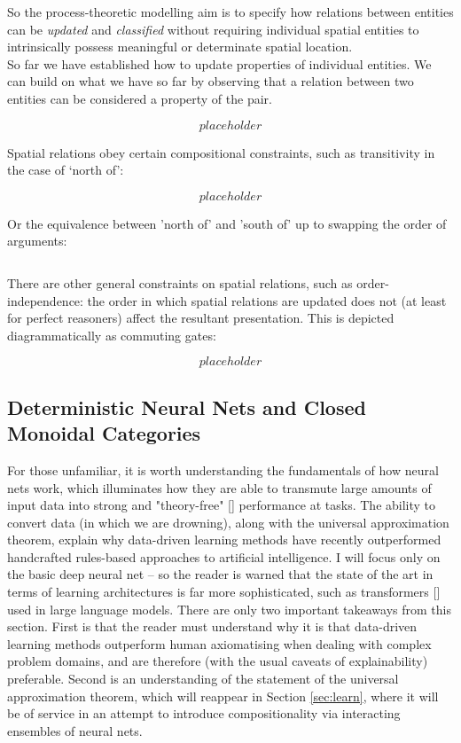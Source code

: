 So the process-theoretic modelling aim is to specify how relations between entities can be \emph{updated} and \emph{classified} without requiring individual spatial entities to intrinsically possess meaningful or determinate spatial location.\\

So far we have established how to update properties of individual entities. We can build on what we have so far by observing that a relation between two entities can be considered a property of the pair.

\[placeholder\]

Spatial relations obey certain compositional constraints, such as transitivity in the case of `north of':

\[placeholder\]

Or the equivalence between 'north of' and 'south of' up to swapping the order of arguments:

\[\]

There are other general constraints on spatial relations, such as order-independence: the order in which spatial relations are updated does not (at least for perfect reasoners) affect the resultant presentation. This is depicted diagrammatically as commuting gates:

\[placeholder\]

\subsection{Deterministic Neural Nets and Closed Monoidal Categories}

For those unfamiliar, it is worth understanding the fundamentals of how neural nets work, which illuminates how they are able to transmute large amounts of input data into strong and "theory-free" [] performance at tasks. The ability to convert data (in which we are drowning), along with the universal approximation theorem, explain why data-driven learning methods have recently outperformed handcrafted rules-based approaches to artificial intelligence. I will focus only on the basic deep neural net -- so the reader is warned that the state of the art in terms of learning architectures is far more sophisticated, such as transformers [] used in large language models. There are only two important takeaways from this section. First is that the reader must understand why it is that data-driven learning methods outperform human axiomatising when dealing with complex problem domains, and are therefore (with the usual caveats of explainability) preferable. Second is an understanding of the statement of the universal approximation theorem, which will reappear in Section \ref{sec:learn}, where it will be of service in an attempt to introduce compositionality via interacting ensembles of neural nets.

